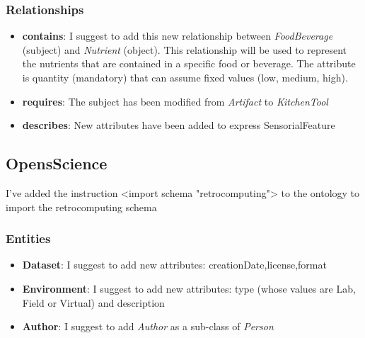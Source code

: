 \subsubsection{Relationships}
\begin{itemize}
    \item \textbf{contains}: I suggest to add this new relationship between \textit{FoodBeverage} (subject) and \textit{Nutrient} (object). This relationship will be used to represent the nutrients that are contained in a specific food or beverage. The attribute is quantity (mandatory) that can assume fixed values (low, medium, high).
    \item \textbf{requires}: The subject has been modified from \textit{Artifact} to \textit{KitchenTool}
    \item \textbf{describes}: New attributes have been added to express SensorialFeature 
\end{itemize}

\subsection{OpensScience}

I've added the instruction <import schema "retrocomputing"> to the ontology to import the retrocomputing schema

\subsubsection{Entities}
\begin{itemize}
    \item \textbf{Dataset}: I suggest to add new attributes: creationDate,license,format
    \item \textbf{Environment}: I suggest to add new attributes: type (whose values are Lab, Field or Virtual) and description
    \item \textbf{Author}: I suggest to add \textit{Author} as a sub-class of \textit{Person}
\end{itemize}
